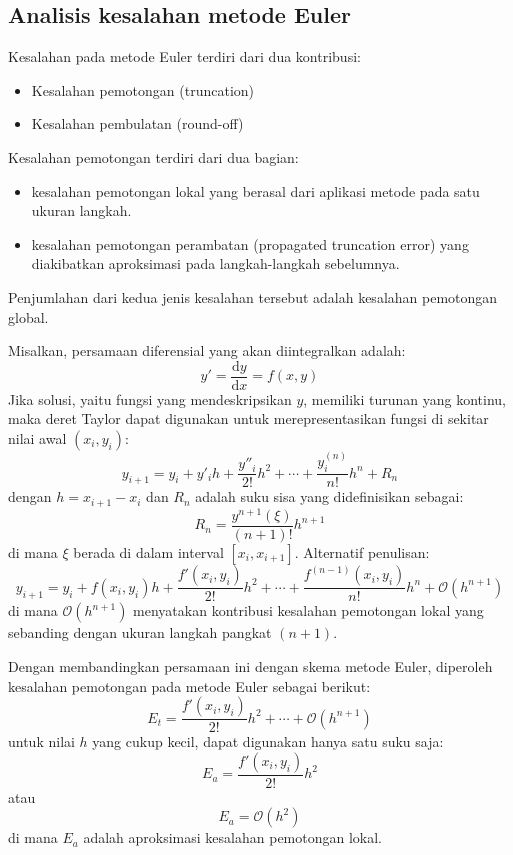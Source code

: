 \subsection*{Analisis kesalahan metode Euler}

Kesalahan pada metode Euler terdiri dari dua kontribusi:
\begin{itemize}
\item Kesalahan pemotongan (truncation)
\item Kesalahan pembulatan (round-off)
\end{itemize}

Kesalahan pemotongan terdiri dari dua bagian:
\begin{itemize}
\item kesalahan pemotongan lokal yang berasal dari aplikasi metode pada satu
ukuran langkah.
\item kesalahan pemotongan perambatan (propagated truncation error) yang diakibatkan
aproksimasi pada langkah-langkah sebelumnya.
\end{itemize}
Penjumlahan dari kedua jenis kesalahan tersebut adalah kesalahan pemotongan global.

Misalkan, persamaan diferensial yang akan diintegralkan adalah:
\begin{equation*}
y' = \frac{\mathrm{d}y}{\mathrm{d}x} = f(x,y)
\end{equation*}
Jika solusi, yaitu fungsi yang mendeskripsikan $y$, memiliki turunan yang kontinu, maka
deret Taylor dapat digunakan untuk merepresentasikan fungsi di sekitar nilai awal
$(x_i, y_i)$:
\begin{equation*}
y_{i+1} = y_{i} + y'_{i} h + \frac{y''_{i}}{2!}h^2 + \cdots + \frac{y^{(n)}_{i}}{n!} h^n + R_n
\end{equation*}
dengan $h = x_{i+1} - x_{i}$ dan $R_n$ adalah suku sisa yang didefinisikan sebagai:
\begin{equation*}
R_n = \frac{y^{n+1}(\xi)}{(n+1)!} h^{n+1}
\end{equation*}
di mana $\xi$ berada di dalam interval $[x_i, x_{i+1}]$.
Alternatif penulisan:
\begin{equation*}
y_{i+1} = y_{i} + f(x_i, y_i) h + \frac{f'(x_i, y_i)}{2!}h^2 + \cdots +
\frac{f^{(n-1)}(x_i, y_i)}{n!} h^n + \mathcal{O}(h^{n+1})
\end{equation*}
di mana $\mathcal{O}(h^{n+1})$ menyatakan kontribusi kesalahan pemotongan lokal
yang sebanding dengan ukuran langkah pangkat $(n+1)$.

Dengan membandingkan persamaan ini dengan skema metode Euler, diperoleh
kesalahan pemotongan pada metode Euler sebagai berikut:
\begin{equation*}
E_{t} = \frac{f'(x_i, y_i)}{2!} h^2 + \cdots + \mathcal{O}(h^{n+1})
\end{equation*}
untuk nilai $h$ yang cukup kecil, dapat digunakan hanya satu suku saja:
\begin{equation*}
E_{a} = \frac{f'(x_i, y_i)}{2!} h^2
\end{equation*}
atau
\begin{equation*}
E_a = \mathcal{O}(h^2)
\end{equation*}
di mana $E_a$ adalah aproksimasi kesalahan pemotongan lokal.

